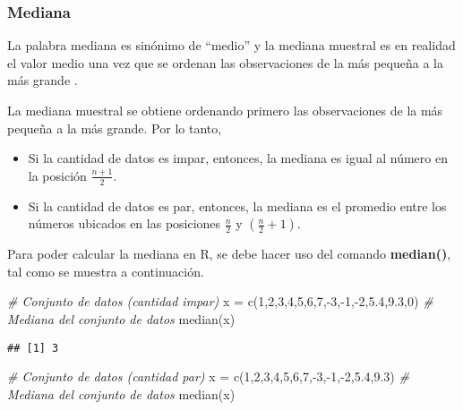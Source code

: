\documentclass[
]{book}
\newenvironment{Shaded}{\begin{snugshade}}{\end{snugshade}}
\newcommand{\CommentTok}[1]{\textcolor[rgb]{0.56,0.35,0.01}{\textit{#1}}}
\newcommand{\DecValTok}[1]{\textcolor[rgb]{0.00,0.00,0.81}{#1}}
\newcommand{\FloatTok}[1]{\textcolor[rgb]{0.00,0.00,0.81}{#1}}
\newcommand{\FunctionTok}[1]{\textcolor[rgb]{0.00,0.00,0.00}{#1}}
\newcommand{\NormalTok}[1]{#1}
\newcommand{\OtherTok}[1]{\textcolor[rgb]{0.56,0.35,0.01}{#1}}
\newcommand{\SpecialCharTok}[1]{\textcolor[rgb]{0.00,0.00,0.00}{#1}}
\providecommand{\tightlist}{%
  \setlength{\itemsep}{0pt}\setlength{\parskip}{0pt}}
\begin{document}
\hypertarget{mediana}{%
\subsubsection*{Mediana}\label{mediana}}

La palabra mediana es sinónimo de ``medio'' y la mediana muestral es en realidad el valor medio una vez que se ordenan las observaciones de la más pequeña a la más grande \citep[página 26]{Devore}.

La mediana muestral se obtiene ordenando primero las observaciones de la más pequeña a la más grande. Por lo tanto,

\begin{itemize}
\tightlist
\item
  Si la cantidad de datos es impar, entonces, la mediana es igual al número en la posición \(\frac{n+1}{2}\).
\item
  Si la cantidad de datos es par, entonces, la mediana es el promedio entre los números ubicados en las posiciones \(\frac{n}{2}\) y \((\frac{n}{2}+1)\).
\end{itemize}

Para poder calcular la mediana en R, se debe hacer uso del comando \textbf{median()}, tal como se muestra a continuación.

\begin{Shaded}
\begin{Highlighting}[]
\CommentTok{\# Conjunto de datos (cantidad impar)}
\NormalTok{x }\OtherTok{=} \FunctionTok{c}\NormalTok{(}\DecValTok{1}\NormalTok{,}\DecValTok{2}\NormalTok{,}\DecValTok{3}\NormalTok{,}\DecValTok{4}\NormalTok{,}\DecValTok{5}\NormalTok{,}\DecValTok{6}\NormalTok{,}\DecValTok{7}\NormalTok{,}\SpecialCharTok{{-}}\DecValTok{3}\NormalTok{,}\SpecialCharTok{{-}}\DecValTok{1}\NormalTok{,}\SpecialCharTok{{-}}\DecValTok{2}\NormalTok{,}\FloatTok{5.4}\NormalTok{,}\FloatTok{9.3}\NormalTok{,}\DecValTok{0}\NormalTok{)}
\CommentTok{\# Mediana del conjunto de datos}
\FunctionTok{median}\NormalTok{(x)}
\end{Highlighting}
\end{Shaded}

\begin{verbatim}
## [1] 3
\end{verbatim}

\begin{Shaded}
\begin{Highlighting}[]
\CommentTok{\# Conjunto de datos (cantidad par)}
\NormalTok{x }\OtherTok{=} \FunctionTok{c}\NormalTok{(}\DecValTok{1}\NormalTok{,}\DecValTok{2}\NormalTok{,}\DecValTok{3}\NormalTok{,}\DecValTok{4}\NormalTok{,}\DecValTok{5}\NormalTok{,}\DecValTok{6}\NormalTok{,}\DecValTok{7}\NormalTok{,}\SpecialCharTok{{-}}\DecValTok{3}\NormalTok{,}\SpecialCharTok{{-}}\DecValTok{1}\NormalTok{,}\SpecialCharTok{{-}}\DecValTok{2}\NormalTok{,}\FloatTok{5.4}\NormalTok{,}\FloatTok{9.3}\NormalTok{)}
\CommentTok{\# Mediana del conjunto de datos}
\FunctionTok{median}\NormalTok{(x)}
\end{Highlighting}
\end{Shaded}
\end{document}
